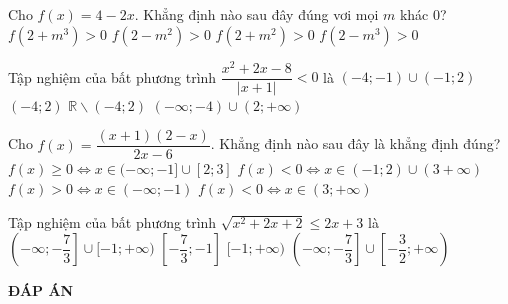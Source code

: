 \begin{ex}%
Cho $f(x)=4-2x$. Khẳng định nào sau đây đúng vơi mọi $m$ khác $0$?	
	\choice
	{$f(2+m^3)>0$}
	{\True $f(2-m^2)>0$}
	{$f(2+m^2)>0$}
	{$f(2-m^3)>0$}
\end{ex}
\begin{ex}%
Tập nghiệm của bất phương trình $\dfrac{x^2+2x-8}{|x+1|}<0$ là 	
	\choice
	{\True $(-4;-1)\cup (-1;2)$}
	{$(-4;2)$}
	{$\mathbb{R}\backslash (-4;2)$}
	{$(-\infty;-4)\cup (2;+\infty)$}
\end{ex}
\begin{ex}%
Cho $f(x)=\dfrac{(x+1)(2-x)}{2x-6}$. Khẳng định nào sau đây là khẳng định đúng?
	\choice
	{$f(x)\ge 0\Leftrightarrow x\in (-\infty;-1]\cup [2;3]$}
	{\True $f(x)< 0\Leftrightarrow x\in (-1;2)\cup (3+\infty)$}
	{$f(x)>0\Leftrightarrow x\in (-\infty;-1)$}
	{$f(x)<0\Leftrightarrow x\in (3;+\infty)$}
\end{ex}
\begin{ex}%
Tập nghiệm của bất phương trình $\sqrt{x^2+2x+2}\le 2x+3$ là 
	\choice
	{$\left(-\infty;-\dfrac{7}{3}\right]\cup [-1;+\infty)$}
	{$\left[-\dfrac{7}{3};-1\right]$}
	{\True $[-1;+\infty)$}
	{$\left(-\infty;-\dfrac{7}{3}\right]\cup \left[-\dfrac{3}{2};+\infty\right)$}
\end{ex}
\newpage
\begin{center}
	\textbf{ĐÁP ÁN}
\end{center}
\begin{multicols}{10}
	 
\end{multicols}
